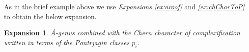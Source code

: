 \documentclass{amsart}
\theoremstyle{plain}
\numberwithin{equation}{section}
\newtheorem{ex}{Expansion}
\newtheorem{f}{Function}
\begin{document}
%
%
%
%

As in the brief example above we use \textit{Expansions \ref{ex:aroof}} and \textit{\ref{ex:chCharToP}} to obtain the below expansion.

\begin{ex}
\^{A}-genus combined with the Chern character of complexification written in terms of the Pontrjagin classes $p_i$.
\end{ex} 

\end{document}
